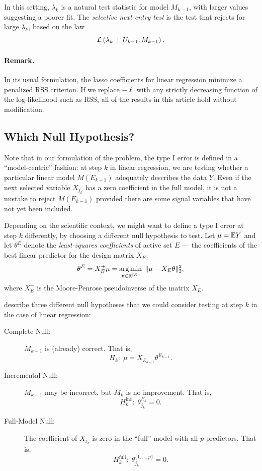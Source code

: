 \documentclass{article}
\begin{document}
In this setting, $\lambda_k$ is a natural test statistic for model $M_{k-1}$, with larger values suggesting a poorer fit. The {\em selective next-entry test} is the test that rejects for large $\lambda_k$, based on the law
\begin{equation*}
\mathcal{L}\left(\lambda_k \;\mid\; U_{k-1}, M_{k-1}\right).
\end{equation*}

\paragraph{Remark.} In its usual formulation, the lasso coefficients for linear regression minimize a penalized RSS criterion. If we replace $-\ell$ with any strictly decreasing function of the log-likelihood such as RSS, all of the results in this article hold without modification.


\subsection{Which Null Hypothesis?}
\label{sec:whichnull}

Note that in our formulation of the problem, the type I error  is defined in a ``model-centric'' fashion: at step $k$ in linear regression, we are testing  whether a particular linear model $M(E_{k-1})$ adequately describes the data $Y$. Even if the next selected variable $X_{j_k}$ has a zero coefficient in the full model, it is not a mistake to reject $M(E_{k-1})$ provided there are some signal variables that have not yet been included.

Depending on the scientific context, we might want to define a type I error at step $k$ differently, by choosing a different null hypothesis to test. Let $\mu = \mathbb{E} Y$ and let $\theta^E$ denote the {\em least-squares coefficients} of active set $E$ --- the coefficients of the best linear predictor for the design matrix $X_E$:
\[
\theta^E = X_E^+ \mu = \operatorname*{arg\,min}_{\theta\in \mathbb{R}^{|E|}} \; \|\mu - X_E\theta\|_2^2,
\]
where $X_E^+$ is the Moore-Penrose pseudoinverse of the matrix $X_E$.

\citet{gsell2013sequential} describe three different null hypotheses that we could consider testing at step $k$ in the case of linear regression:
\begin{description}
\item[Complete Null:] $M_{k-1}$ is (already) correct. That is, 
\[
H_k:\;\mu = X_{E_{k-1}} \theta^{E_{k-1}}.
\]
\item[Incremental Null:] $M_{k-1}$ may be incorrect, but $M_k$ is no improvement. That is, 
\[
H_k^{\text{inc}}:\; \theta_{j_k}^{E_k} = 0.
\]
\item[Full-Model Null:] The coefficient of $X_{j_k}$ is zero in the ``full'' model with all $p$ predictors. That is,
\[
H_k^{\text{full}}:\; \theta_{j_k}^{\{1,\ldots,p\}} = 0.
\]
\end{description}
\end{document}
